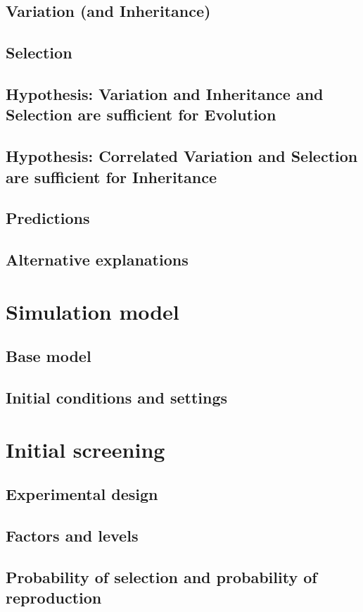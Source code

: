 \documentclass[]{report}
\begin{document}
\section{Variation (and Inheritance)}
\section{Selection}
\section{Hypothesis: Variation and Inheritance and Selection are sufficient for Evolution}
\section{Hypothesis: Correlated Variation and Selection are sufficient for Inheritance}
\section{Predictions}
\section{Alternative explanations}

\chapter{Simulation model}
\section{Base model}
\section{Initial conditions and settings}

\chapter{Initial screening}
\section{Experimental design}
\section{Factors and levels}
\section{Probability of selection and probability of reproduction}
\end{document}
